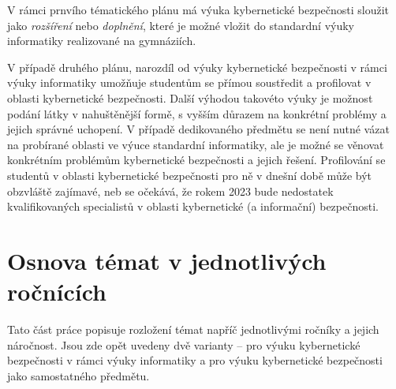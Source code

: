 \documentclass[a4paper, 12pt]{article}
\begin{document}
V rámci prnvího tématického plánu má výuka kybernetické bezpečnosti sloužit jako \textit{rozšíření} nebo \textit{doplnění}, které je možné vložit do standardní výuky informatiky realizované na gymnáziích. 

V případě druhého plánu, narozdíl od výuky kybernetické bezpečnosti v rámci výuky informatiky umožňuje studentům se přímou soustředit a profilovat v oblasti kybernetické bezpečnosti. Další výhodou takovéto výuky je možnost podání látky v nahuštěnější formě, s vyšším důrazem na konkrétní problémy a jejich správné uchopení. V případě dedikovaného předmětu se není nutné vázat na probírané oblasti ve výuce standardní informatiky, ale je možné se věnovat konkrétním problémům kybernetické bezpečnosti a jejich řešení. Profilování se studentů v oblasti kybernetické bezpečnosti pro ně v dnešní době může být obzvláště zajímavé, neb se očekává, že rokem 2023 bude nedostatek kvalifikovaných specialistů v oblasti kybernetické (a informační) bezpečnosti.



\newpage
\section{Osnova témat v jednotlivých ročnících}
Tato část práce popisuje rozložení témat napříč jednotlivými ročníky a jejich náročnost. Jsou zde opět uvedeny dvě varianty -- pro výuku kybernetické bezpečnosti v rámci výuky informatiky a pro výuku kybernetické bezpečnosti jako samostatného předmětu.
\end{document}
